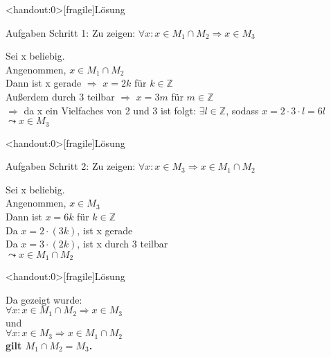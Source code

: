 {
\begin{frame}<handout:0>[fragile]{Lösung}
    \begin{alertblock}{Aufgaben}
        Schritt 1: Zu zeigen: $\forall x: x \in M_1 \cap M_2 \Rightarrow x \in M_3$
    \end{alertblock}

    Sei x beliebig.\\
    Angenommen, $x \in M_1 \cap M_2$\\
    Dann ist x gerade $\Rightarrow$ $x= 2k$ für $k \in \mathbb{Z}$\\
    Außerdem durch 3 teilbar $\Rightarrow$ $x= 3m$ für $m \in \mathbb{Z}$\\
    $\Rightarrow$ da x ein Vielfaches von 2 und 3 ist folgt: $\exists l \in \mathbb{Z}$, sodass $x=2\cdot 3 \cdot l = 6l$\\
    $\leadsto x \in M_3$



\end{frame}
}
{
\begin{frame}<handout:0>[fragile]{Lösung}
    \begin{alertblock}{Aufgaben}
        Schritt 2: Zu zeigen: $\forall x: x \in M_3 \Rightarrow x \in M_1 \cap M_2$\\
    \end{alertblock}

    Sei x beliebig.\\
    Angenommen, $x \in M_3$\\
    Dann ist $x = 6k$ für $k \in \mathbb{Z}$\\
    Da $x = 2 \cdot (3k)$, ist x gerade\\
    Da $x= 3 \cdot (2k)$, ist x durch 3 teilbar\\
    $\leadsto x \in M_1 \cap M_2$



\end{frame}
}

{
\begin{frame}<handout:0>[fragile]{Lösung}


    Da gezeigt wurde:\\
    \vspace{0.3cm}
    $\forall x: x \in M_1 \cap M_2 \Rightarrow x \in M_3$\\
    \alert{und}\\
    $\forall x: x \in M_3 \Rightarrow x \in M_1 \cap M_2$\\
    \vspace{0.3cm}
    \textbf{gilt $M_1 \cap M_2 = M_3$.}


\end{frame}
}

